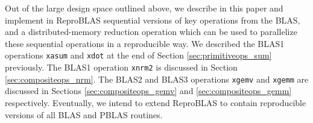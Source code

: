  Out of the large design space outlined above, we describe in this paper and implement in ReproBLAS sequential versions of key operations from the BLAS, and a distributed-memory reduction operation which can be used to parallelize these sequential operations in a reproducible way. We described the BLAS1 operations \texttt{xasum} and \texttt{xdot} at the end of Section \ref{sec:primitiveops_sum} previously. The BLAS1 operation \texttt{xnrm2} is discussed in Section \ref{sec:compositeops_nrm}. The BLAS2 and BLAS3 operations \texttt{xgemv} and \texttt{xgemm} are discussed in Sections \ref{sec:compositeops_gemv} and \ref{sec:compositeops_gemm} respectively. Eventually, we intend to extend ReproBLAS to contain reproducible versions of all BLAS and PBLAS routines.

    
    
    
    
